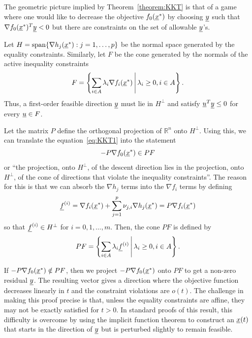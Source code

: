 The geometric picture implied by Theorem~\ref{theorem:KKT} is that of a game where one would like to decrease the objective $f_0 (\underline{x}^*)$ by choosing $\underline{y}$ such that $\nabla f_0 (\underline{x}^*)^T \underline{y}  < 0$ but there are  constraints on the set of allowable $\underline{y}$'s.

Let $H=\mathrm{span}\{\nabla h_j(\underline{x}^*):j=1,\ldots,p\}$ be the normal space generated by the equality constraints.  Similarly, let $F$ be the cone generated by the normals of the active inequality constraints
\[ F = \left\{ \sum_{i\in A} \lambda_i \nabla f_i (\underline{x}^*) \, \middle| \, \lambda_i \geq 0, i \in A   \right\}. \]
Thus, a first-order feasible direction $\underline y$ must lie in $H^\perp$ and satisfy $\underline u^T\underline y\leq0$ for every $\underline u\in F$.

Let the matrix $P$ define the orthogonal projection of $\mathbb{R}^n$ onto $H^\perp$.
Using this, we can translate the equation~\eqref{eq:KKT1} into the statement
\[ -P \nabla f_0 (\underline{x}^*) \in P F \]  or ``the projection, onto $H^\perp$, of the descent direction  lies in the projection, onto $H^\perp$, of the cone of directions that violate the inequality constraints''.
The reason for this is that we can absorb the $\nabla h_j$ terms into the $\nabla f_i$ terms by defining
\[ \underline{f}^{(i)} = \nabla f_i (\underline{x}^*) + \sum_{j=1}^p \nu_{j,i} \nabla h_j (\underline{x}^*) = P \nabla f_i (\underline{x}^*) \]
so that $\underline{f}^{(i)} \in H^{\perp}$ for $i=0,1,\ldots,m$.
Then, the cone $PF$ is defined by
\[ PF = \left\{ \sum_{i\in A} \lambda_i \underline{f}^{(i)} \, \middle| \, \lambda_i \geq 0, i\in A \right\}. \]

If $-P \nabla f_0 (\underline{x}^*) \notin P F$, then we project $-P \nabla f_0 (\underline{x}^*)$ onto $PF$ to get a non-zero residual $\underline{y}$.
The resulting vector gives a direction where the objective function decreases linearly in $t$ and the constraint violations are $o(t)$.
The challenge in making this proof precise is that, unless the equality constraints are affine, they may not be exactly satisfied for $t>0$.
In standard proofs of this result, this difficulty is overcome by using the implicit function theorem to construct an $\underline{x} (t)$ that starts in the direction of $\underline{y}$ but is perturbed slightly to remain feasible.

